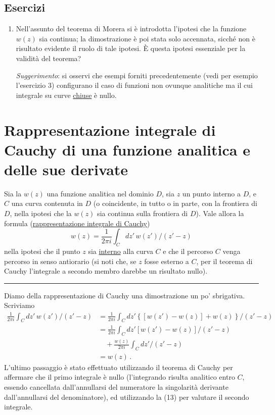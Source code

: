 \documentclass[11pt, a4paper]{book}
\numberwithin{equation}{section}
\newenvironment{esercizi}{\subsection*{Esercizi}\begin{enumerate}}{\end{enumerate}}
\begin{document}
\begin{esercizi}
\item Nell'assunto del teorema di Morera si è introdotta l'ipotesi che la funzione $w(z)$ sia continua; la dimostrazione è poi stata solo accennata, sicché non è risultato evidente il ruolo di tale ipotesi. È questa ipotesi essenziale per la validità del teorema?

\textit{Suggerimento}: si osservi che esempi forniti precedentemente (vedi per esempio l'esercizio 3) configurano il caso di funzioni non ovunque analitiche ma il cui integrale su curve \uline{chiuse} è nullo.

\end{esercizi}

\section{Rappresentazione integrale di Cauchy di una funzione analitica e delle sue derivate}

Sia la $w(z)$ una funzione analitica nel dominio $D$, sia $z$ un punto interno a $D$, e $C$ una curva contenuta in $D$ (o coincidente, in tutto o in parte, con la frontiera di $D$, nella ipotesi che la $w(z)$ sia continua sulla frontiera di $D$). Vale allora la formula (\uline{rappresentazione integrale di Cauchy})
\begin{equation}
w(z) = \frac{1}{2\pi i} \int_C dz'\, w(z') / (z' - z) \tag{1}
\end{equation}
nella ipotesi che il punto $z$ sia \uline{interno} alla curva $C$ e che il percorso $C$ venga percorso in senso antiorario (si noti che, se $z$ fosse esterno a $C$, per il teorema di Cauchy l'integrale a secondo membro darebbe un risultato nullo).

\medskip\hrule\medskip

Diamo della rappresentazione di Cauchy una dimostrazione un po' sbrigativa. Scriviamo
\begin{align*}
\frac{1}{2\pi i} \int_C dz'\, w(z')/(z'-z)
&= \frac{1}{2\pi i} \int_C dz' \left\{ \left[w(z')-w(z)\right]+w(z) \right\}/(z'-z) \\
&= \frac{1}{2\pi i} \int_C dz' \left[w(z')-w(z)\right]/(z'-z) \\
&\quad + \frac{w(z)}{2\pi i} \int_C dz'/(z'-z) \\
&= w(z)\,.
\end{align*}
L'ultimo passaggio è stato effettuato utilizzando il teorema di Cauchy per affermare che il primo integrale è nullo (l'integrando risulta analitico entro $C$, essendo cancellata dall'annullarsi del numeratore la singolarità derivante dall'annullarsi del denominatore), ed utilizzando la (13) per valutare il secondo integrale.
\end{document}
